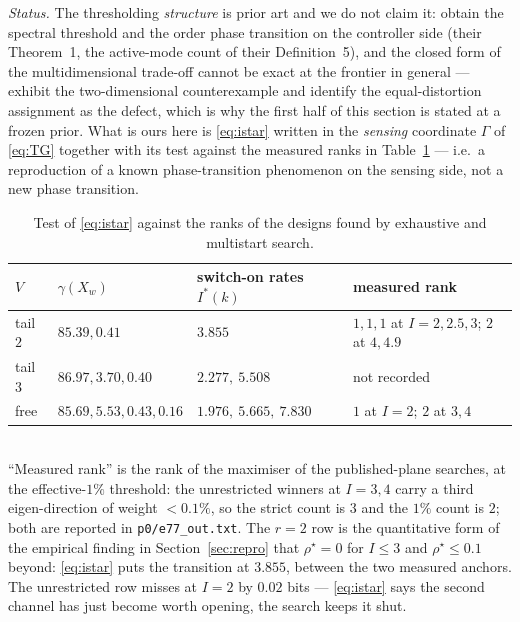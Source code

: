 \emph{Status.} The thresholding \emph{structure} is prior art and we do not
claim it: \cite{fox2016a} obtain the spectral threshold and the order
phase transition on the controller side (their Theorem~1, the active-mode count
of their Definition~5), and the closed form of the multidimensional
trade-off cannot be exact at the frontier in general ---
\cite{stavrou2017revisited} exhibit the two-dimensional counterexample and
identify the equal-distortion assignment as the defect, which is why
the first half of this section is stated at a frozen prior. What is ours here
is \eqref{eq:istar} written in the \emph{sensing} coordinate $\Gamma$ of
\eqref{eq:TG} together with its test against the measured ranks in
Table~\ref{tab:switch} --- i.e.\ a reproduction of a known phase-transition
phenomenon on the sensing side, not a new phase transition.

\begin{table}[h]
 \centering\caption{Test of \eqref{eq:istar} against the ranks of the designs
 found by exhaustive and multistart search.}
 \label{tab:switch}
 {\scriptsize
 \begin{tabularx}{\columnwidth}{@{}lllX@{}}
 \hline
 $V$ & $\gamma(X_w)$ & switch-on rates $I^*(k)$ & measured rank \\
 \hline
 tail $2$ & $85.39,0.41$ & $3.855$ & $1,1,1$ at $I=2,2.5,3$; $2$ at $4,4.9$ \\
 tail $3$ & $86.97,3.70,0.40$ & $2.277,\ 5.508$ & not recorded \\
 free & $85.69,5.53,0.43,0.16$ & $1.976,\ 5.665,\ 7.830$ & $1$ at $I=2$; $2$ at $3,4$ \\
 \hline
 \end{tabularx}}
 \\[1pt]{\scriptsize ``Measured rank'' is the rank of the maximiser of the
 published-plane searches, at the effective-$1\%$ threshold: the unrestricted
 winners at $I=3,4$ carry a third eigen-direction of weight $<0.1\%$, so the
 strict count is $3$ and the $1\%$ count is $2$; both are reported in
 \texttt{p0/e77\_out.txt}. The $r=2$ row is the quantitative form of the
 empirical finding in Section~\ref{sec:repro} that $\rho^{\star}=0$ for $I\le3$
 and $\rho^{\star}\le0.1$ beyond: \eqref{eq:istar} puts the transition at
 $3.855$, between the two measured anchors. The unrestricted row misses at
 $I=2$ by $0.02$ bits --- \eqref{eq:istar} says the second channel has just
 become worth opening, the search keeps it shut. }
\end{table}

